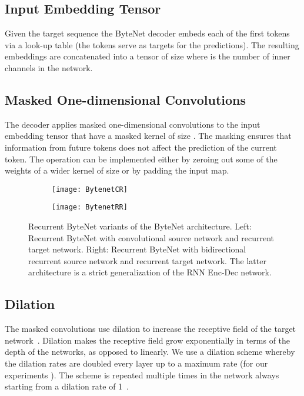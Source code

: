\documentclass{article}
\begin{document}
\subsection{Input Embedding Tensor}
Given the target sequence  the ByteNet decoder embeds each of the first  tokens  via a look-up table (the  tokens  serve as targets for the predictions). The resulting embeddings are concatenated into a tensor of size  where  is the number of inner channels in the network.


\subsection{Masked One-dimensional Convolutions}
\label{masked}
The decoder applies masked one-dimensional convolutions \citep{van2016pixel} to the input embedding tensor that have a masked kernel of size . The masking ensures that information from future tokens does not affect the prediction of the current token.  The operation can be implemented either by zeroing out some of the weights of a wider kernel of size  or by padding the input map. 

\begin{figure}[t]
\centering
\hspace{-1cm}
\begin{subfigure}{}
    \texttt{[image: BytenetCR]}
    \label{fig:mt_decoder_block}
\end{subfigure}
\hspace{1cm}
\begin{subfigure}{}
    \texttt{[image: BytenetRR]}
    \label{fig:lm_decoder_block}
\end{subfigure}
\hspace{-1cm}
\caption{Recurrent ByteNet variants of the ByteNet architecture. Left: Recurrent ByteNet with convolutional source network and recurrent target network. Right: Recurrent ByteNet with bidirectional recurrent source network and recurrent target network. The latter architecture is a strict generalization of the RNN Enc-Dec network. }
\label{recurrentBytenet}
\end{figure}

\subsection{Dilation}
\label{dilation}

The masked convolutions use dilation to increase the receptive field of the target network~\citep{DBLP:journals/corr/ChenPKMY14,DBLP:journals/corr/YuK15}. Dilation makes the receptive field grow exponentially in terms of the depth of the networks, as opposed to linearly.  We use a dilation scheme whereby the dilation rates are doubled every layer up to a maximum rate  (for our experiments ). The scheme is repeated multiple times in the network always starting from a dilation rate of 1~\citep{wavenet,vpn}. 
\end{document}
